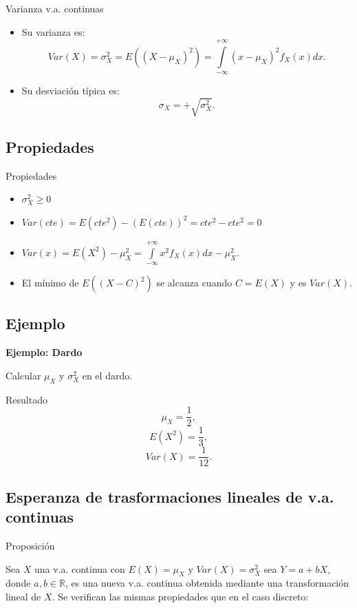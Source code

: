\documentclass[]{book}
\providecommand{\tightlist}{%
  \setlength{\itemsep}{0pt}\setlength{\parskip}{0pt}}
\begin{document}
 Varianza v.a. continuas

\begin{itemize}
\tightlist
\item
  Su varianza es:
  \[
  Var(X)=\sigma_{X}^2=E((X-\mu_{X})^2)=
  \displaystyle\int\limits_{-\infty}^{+\infty} (x-\mu_{X})^2 f_{X}(x)dx.
  \]
\item
  Su desviación típica es: \[\sigma_{X}=+\sqrt{\sigma_{X}^2}.\]
\end{itemize}

\hypertarget{propiedades-19}{%
\subsection{Propiedades}\label{propiedades-19}}

 Propiedades

\begin{itemize}
\tightlist
\item
  \(\sigma_{X}^2\geq 0\)
\item
  \(Var(cte)=E(cte^2)-(E(cte))^2= cte^2 - cte^2=0\)
\item
  \(Var(x)=E(X^2)-\mu_{X}^2=\int\limits_{-\infty}^{+\infty}x^2 f_{X}(x)dx - \mu_{X}^2.\)
\item
  El mínimo de \(E((X-C)^2)\) se alcanza cuando \(C=E(X)\) y es \(Var(X)\).
\end{itemize}

\hypertarget{ejemplo-21}{%
\subsection{Ejemplo}\label{ejemplo-21}}

\textbf{Ejemplo: Dardo}

Calcular \(\mu_{X}\) y \(\sigma_{X}^2\) en el dardo.

Resultado
\[\mu_{X}=\frac12,\]
\[E(X^2)=\frac13,\]
\[Var(X)=\frac1{12}.\]

\hypertarget{esperanza-de-trasformaciones-lineales-de-v.a.-continuas}{%
\subsection{Esperanza de trasformaciones lineales de v.a. continuas}\label{esperanza-de-trasformaciones-lineales-de-v.a.-continuas}}

 Proposición

Sea \(X\) una v.a. continua con \(E(X)=\mu_{X}\) y \(Var(X)=\sigma_{X}^2\) sea \(Y=a+b X\), donde
\(a,b\in\mathbb{R}\), es una nueva v.a. continua obtenida mediante una transformación lineal de \(X\).
Se verifican las mismas propiedades que en el caso discreto:
\end{document}
